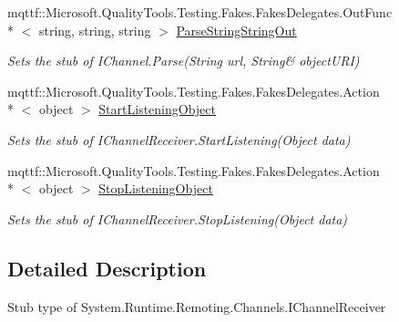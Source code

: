 \begin{DoxyCompactItemize}
mqttf\-::\-Microsoft.\-Quality\-Tools.\-Testing.\-Fakes.\-Fakes\-Delegates.\-Out\-Func\\*
$<$ string, string, string $>$ \hyperlink{class_system_1_1_runtime_1_1_remoting_1_1_channels_1_1_fakes_1_1_stub_i_channel_receiver_a6dabfcabca305ab19882e263b257c9c4}{Parse\-String\-String\-Out}
\begin{DoxyCompactList}\small\item\em Sets the stub of I\-Channel.\-Parse(String url, String\& object\-U\-R\-I)\end{DoxyCompactList}\item 
mqttf\-::\-Microsoft.\-Quality\-Tools.\-Testing.\-Fakes.\-Fakes\-Delegates.\-Action\\*
$<$ object $>$ \hyperlink{class_system_1_1_runtime_1_1_remoting_1_1_channels_1_1_fakes_1_1_stub_i_channel_receiver_a5f136fbc5ecf0d63b21405406e9db7fb}{Start\-Listening\-Object}
\begin{DoxyCompactList}\small\item\em Sets the stub of I\-Channel\-Receiver.\-Start\-Listening(\-Object data)\end{DoxyCompactList}\item 
mqttf\-::\-Microsoft.\-Quality\-Tools.\-Testing.\-Fakes.\-Fakes\-Delegates.\-Action\\*
$<$ object $>$ \hyperlink{class_system_1_1_runtime_1_1_remoting_1_1_channels_1_1_fakes_1_1_stub_i_channel_receiver_a1b67ec5d6a87ae9d5f55bf71c7c5b4f9}{Stop\-Listening\-Object}
\begin{DoxyCompactList}\small\item\em Sets the stub of I\-Channel\-Receiver.\-Stop\-Listening(\-Object data)\end{DoxyCompactList}\end{DoxyCompactItemize}


\subsection{Detailed Description}
Stub type of System.\-Runtime.\-Remoting.\-Channels.\-I\-Channel\-Receiver




